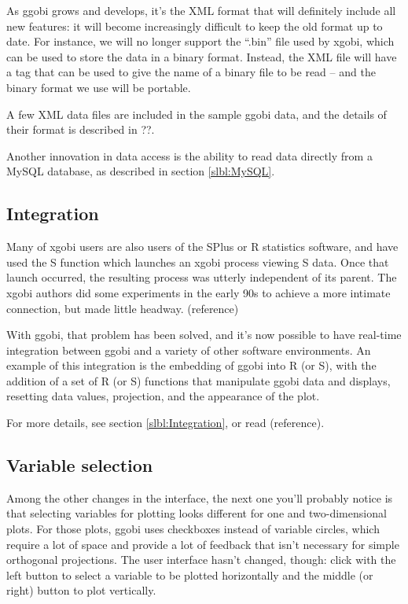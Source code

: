 \documentclass[11pt]{article}
\begin{document}
As ggobi grows and develops, it's the XML format that will
definitely include all new features: it will become increasingly
difficult to keep the old format up to date.  For instance, we
will no longer support the ``.bin'' file used by xgobi, which
can be used to store the data in a binary format.  Instead,
the XML file will have a tag that can be used to give the
name of a binary file to be read -- and the binary format we
use will be portable.

A few XML data files are included in the sample ggobi data, and
the details of their format is described in ??.

Another innovation in data access is the ability to read data
directly from a MySQL database, as described in section \ref{slbl:MySQL}.

\subsection{Integration}

Many of xgobi users are also users of the SPlus or R statistics
software, and have used the S function which launches an xgobi
process viewing S data.  Once that launch occurred, the resulting
process was utterly independent of its parent.  The xgobi authors
did some experiments in the early 90s to achieve a more intimate
connection, but made little headway.  (reference)

With ggobi, that problem has been solved, and it's now possible
to have real-time integration between ggobi and a variety of
other software environments.  An example of this integration is
the embedding of ggobi into R (or S), with the addition of a set of
R (or S) functions that manipulate ggobi data and displays,
resetting data values, projection, and the appearance of the plot.

For more details, see section \ref{slbl:Integration}, or read
(reference).

\subsection {Variable selection}

Among the other changes in the interface, the next one you'll
probably notice is that selecting variables for plotting looks
different for one and two-dimensional plots.  For those plots, ggobi
uses checkboxes instead of variable circles, which require a lot of
space and provide a lot of feedback that isn't necessary for simple
orthogonal projections.  The user interface hasn't changed, though:
click with the left button to select a variable to be plotted
horizontally and the middle (or right) button to plot vertically.
\end{document}
